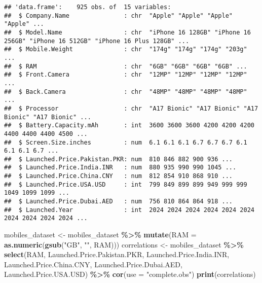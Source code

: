 \documentclass[
]{article}
\newenvironment{Shaded}{\begin{snugshade}}{\end{snugshade}}
\newcommand{\AttributeTok}[1]{\textcolor[rgb]{0.13,0.29,0.53}{#1}}
\newcommand{\FunctionTok}[1]{\textcolor[rgb]{0.13,0.29,0.53}{\textbf{#1}}}
\newcommand{\NormalTok}[1]{#1}
\newcommand{\OtherTok}[1]{\textcolor[rgb]{0.56,0.35,0.01}{#1}}
\newcommand{\SpecialCharTok}[1]{\textcolor[rgb]{0.81,0.36,0.00}{\textbf{#1}}}
\newcommand{\StringTok}[1]{\textcolor[rgb]{0.31,0.60,0.02}{#1}}
\begin{document}
\begin{verbatim}
## 'data.frame':    925 obs. of  15 variables:
##  $ Company.Name               : chr  "Apple" "Apple" "Apple" "Apple" ...
##  $ Model.Name                 : chr  "iPhone 16 128GB" "iPhone 16 256GB" "iPhone 16 512GB" "iPhone 16 Plus 128GB" ...
##  $ Mobile.Weight              : chr  "174g" "174g" "174g" "203g" ...
##  $ RAM                        : chr  "6GB" "6GB" "6GB" "6GB" ...
##  $ Front.Camera               : chr  "12MP" "12MP" "12MP" "12MP" ...
##  $ Back.Camera                : chr  "48MP" "48MP" "48MP" "48MP" ...
##  $ Processor                  : chr  "A17 Bionic" "A17 Bionic" "A17 Bionic" "A17 Bionic" ...
##  $ Battery.Capacity.mAh       : int  3600 3600 3600 4200 4200 4200 4400 4400 4400 4500 ...
##  $ Screen.Size.inches         : num  6.1 6.1 6.1 6.7 6.7 6.7 6.1 6.1 6.1 6.7 ...
##  $ Launched.Price.Pakistan.PKR: num  810 846 882 900 936 ...
##  $ Launched.Price.India.INR   : num  880 935 990 990 1045 ...
##  $ Launched.Price.China.CNY   : num  812 854 910 868 910 ...
##  $ Launched.Price.USA.USD     : int  799 849 899 899 949 999 999 1049 1099 1099 ...
##  $ Launched.Price.Dubai.AED   : num  756 810 864 864 918 ...
##  $ Launched.Year              : int  2024 2024 2024 2024 2024 2024 2024 2024 2024 2024 ...
\end{verbatim}

\begin{Shaded}
\begin{Highlighting}[]
\NormalTok{mobiles\_dataset }\OtherTok{\textless{}{-}}\NormalTok{ mobiles\_dataset }\SpecialCharTok{\%\textgreater{}\%}
  \FunctionTok{mutate}\NormalTok{(}\AttributeTok{RAM =} \FunctionTok{as.numeric}\NormalTok{(}\FunctionTok{gsub}\NormalTok{(}\StringTok{"GB"}\NormalTok{, }\StringTok{""}\NormalTok{, RAM)))  }
\NormalTok{correlations }\OtherTok{\textless{}{-}}\NormalTok{ mobiles\_dataset }\SpecialCharTok{\%\textgreater{}\%} 
  \FunctionTok{select}\NormalTok{(RAM, Launched.Price.Pakistan.PKR, Launched.Price.India.INR, }
\NormalTok{         Launched.Price.China.CNY, Launched.Price.Dubai.AED, }\StringTok{\textasciigrave{}}\AttributeTok{Launched.Price.USA.USD}\StringTok{\textasciigrave{}}\NormalTok{) }\SpecialCharTok{\%\textgreater{}\%} 
  \FunctionTok{cor}\NormalTok{(}\AttributeTok{use =} \StringTok{"complete.obs"}\NormalTok{)}
\FunctionTok{print}\NormalTok{(correlations)}
\end{Highlighting}
\end{Shaded}
\end{document}
